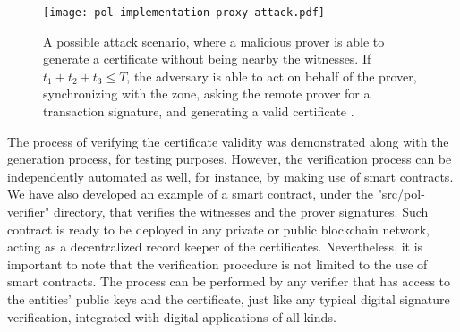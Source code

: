 \begin{figure}[h!]
    \begin{center}
    \texttt{[image: pol-implementation-proxy-attack.pdf]}
    \caption{A possible attack scenario, where a malicious prover is able to generate a \pol{} certificate without being nearby the witnesses. If $t_1 + t_2 + t_3 \leq T$, the adversary is able to act on behalf of the prover, synchronizing with the zone, asking the remote prover for a transaction signature, and generating a valid certificate \cite{nosouhi2020blockchain}.}
    \label{fig:pol-implementation:overview-proxy-wormhole}
    \end{center}
\end{figure}

The process of verifying the certificate validity was demonstrated along with the generation process, for testing purposes. However, the verification process can be independently automated as well, for instance, by making use of smart contracts. We have also developed an example of a smart contract, under the "src/pol-verifier" directory, that verifies the witnesses and the prover signatures. Such contract is ready to be deployed in any private or public blockchain network, acting as a decentralized record keeper of the \pol{} certificates. Nevertheless, it is important to note that the verification procedure is not limited to the use of smart contracts. The process can be performed by any verifier that has access to the entities' public keys and the \pol{} certificate, just like any typical digital signature verification, integrated with digital applications of all kinds.





